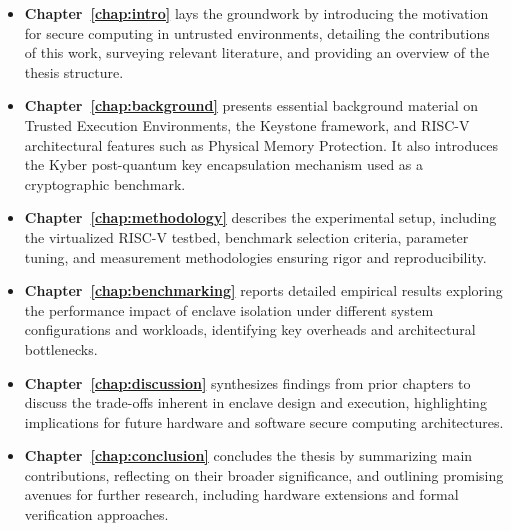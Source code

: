 \begin{itemize}
    \item \textbf{Chapter~\ref{chap:intro}} lays the groundwork by introducing the motivation for secure computing in untrusted environments, detailing the contributions of this work, surveying relevant literature, and providing an overview of the thesis structure.
    
    \item \textbf{Chapter~\ref{chap:background}} presents essential background material on Trusted Execution Environments, the Keystone framework, and RISC-V architectural features such as Physical Memory Protection. It also introduces the Kyber post-quantum key encapsulation mechanism used as a cryptographic benchmark.
    
    \item \textbf{Chapter~\ref{chap:methodology}} describes the experimental setup, including the virtualized RISC-V testbed, benchmark selection criteria, parameter tuning, and measurement methodologies ensuring rigor and reproducibility.
    
    \item \textbf{Chapter~\ref{chap:benchmarking}} reports detailed empirical results exploring the performance impact of enclave isolation under different system configurations and workloads, identifying key overheads and architectural bottlenecks.
    
    \item \textbf{Chapter~\ref{chap:discussion}} synthesizes findings from prior chapters to discuss the trade-offs inherent in enclave design and execution, highlighting implications for future hardware and software secure computing architectures.
    
    \item \textbf{Chapter~\ref{chap:conclusion}} concludes the thesis by summarizing main contributions, reflecting on their broader significance, and outlining promising avenues for further research, including hardware extensions and formal verification approaches.
\end{itemize}
